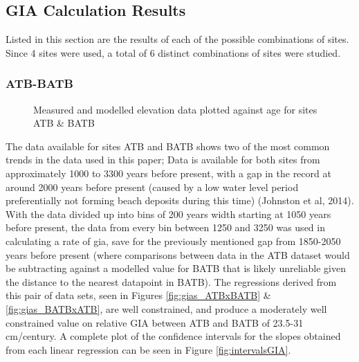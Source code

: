 

\subsection{GIA Calculation Results}



Listed in this section are the results of each of the possible combinations of sites.
Since 4 sites were used, a total of 6 distinct combinations of sites were studied.


\subsubsection{ATB-BATB}

\begin{figure}[h]
	\caption{Measured and modelled elevation data plotted against age for sites ATB \& BATB}
	\label{fig:data_ATBxBATB}
\end{figure}
The data available for sites ATB and BATB shows two of the most common trends in
 the data used in this paper; Data is available for both sites from
 approximately 1000 to 3300 years before present,
 with a gap in the record at around 2000 years before present (caused by a low
 water level period preferentially not forming beach deposits during this time)
 (Johnston et al, 2014). With the data divided up into bins of 200 years width
 starting at 1050 years before present, the data from every bin between 1250 and 3250 was used
 in calculating a rate of gia, save for the previously mentioned gap from 1850-2050
 years before present (where comparisons between data in the ATB dataset would be
 subtracting against a modelled value for BATB that is likely unreliable given
 the distance to the nearest datapoint in BATB). The regressions derived from this pair of data sets,
 seen in Figures \ref{fig:gias_ATBxBATB} \& \ref{fig:gias_BATBxATB}, are well
 constrained, and produce a moderately well constrained value on relative GIA
 between ATB and BATB of 23.5-31 cm/century. A complete plot of the confidence intervals
 for the slopes obtained from each linear regression can be seen in Figure \ref{fig:intervalsGIA}. \\


